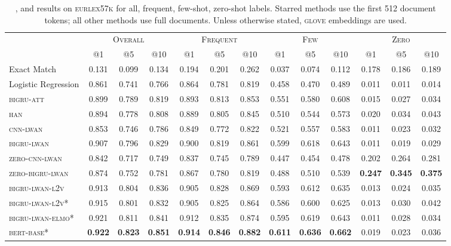 \documentclass[11pt,a4paper]{article}
\newcommand{\bigruatt}{\textsc{bigru-att}\xspace}
\newcommand{\han}{\textsc{han}\xspace}
\newcommand{\lwancnn}{\textsc{cnn-lwan}\xspace}
\newcommand{\zlwancnn}{\textsc{zero-cnn-lwan}\xspace}
\newcommand{\lwangru}{\textsc{bigru-lwan}\xspace}
\newcommand{\lwangrulv}{\textsc{bigru-lwan-l2v}}
\newcommand{\lwangruelmo}{\textsc{bigru-lwan-elmo}}
\newcommand{\zlwangru}{\textsc{zero-bigru-lwan}\xspace}
\newcommand{\glove}{\textsc{glove}\xspace}
\newcommand{\bertbase}{\textsc{bert-base}\xspace}
\newcommand{\newdata}{\textsc{eurlex57k}\xspace}
\begin{document}
\vspace{-2mm}

\begin{table*}[h!]
\centering
{
\footnotesize\addtolength{\tabcolsep}{-2pt}
\begin{tabular}{lcccccccccccc}
  \hline
  & \multicolumn{3}{c}{\textsc{Overall}} & \multicolumn{3}{c}{\textsc{Frequent}} & \multicolumn{3}{c}{\textsc{Few}} & \multicolumn{3}{c}{\textsc{Zero}} \\ 
  & @1 & @5 & @10 & @1 & @5 & @10 & @1 & @5 & @10 & @1 & @5 & @10 \\
  \cline{2-13}
  Exact Match & 0.131 & 0.099 & 0.134 & 0.194 & 0.201 & 0.262 & 0.037 & 0.074 & 0.112 & 0.178 & 0.186 & 0.189 \\
  Logistic Regression & 0.861 & 0.741 & 0.766 & 0.864 & 0.781 & 0.819 & 0.458 & 0.470 & 0.489 & 0.011 & 0.011 & 0.014 \\
  \hline
  \bigruatt & 0.899 & 0.789 & 0.819 & 0.893 & 0.813 & 0.853 & 0.551 & 0.580 & 0.608 & 0.015 & 0.027 & 0.034 \\
  \han & 0.894 & 0.778 & 0.808 & 0.889 & 0.805 & 0.845 & 0.510 & 0.544 & 0.573 & 0.020 & 0.034 & 0.043 \\
  \hline
 \lwancnn & 0.853 & 0.746 & 0.786 & 0.849 & 0.772 & 0.822 & 0.521 & 0.557 & 0.583 & 0.011 & 0.023 & 0.032 \\
  \lwangru & 0.907 & 0.796 & 0.829 & 0.900 & 0.819 & 0.861 & 0.599 & 0.618 & 0.643 & 0.011 & 0.019 & 0.029 \\
   \hline
  \zlwancnn & 0.842 & 0.717 & 0.749 & 0.837 & 0.745 & 0.789 & 0.447 & 0.454 & 0.478 & 0.202 & 0.264 & 0.281 \\
  \zlwangru & 0.874 & 0.752 & 0.781 & 0.867 & 0.780 & 0.819 & 0.488 & 0.510 & 0.539 & \textbf{0.247} & \textbf{0.345} & \textbf{0.375} \\
  \hline\hline
   \lwangrulv & 0.913 & 0.804 & 0.836 & 0.905 & 0.828 & 0.869 & 0.593 & 0.612 & 0.635 & 0.013 & 0.024 & 0.035 \\
\hline
\lwangrulv* & 0.915 & 0.801 & 0.832 & 0.905 & 0.825 & 0.864 & 0.586 & 0.600 & 0.625 & 0.013 & 0.030 & 0.042 \\
\lwangruelmo* & 0.921 & 0.811 & 0.841 & 0.912 & 0.835 & 0.874 & 0.595 & 0.619 & 0.643 & 0.011 & 0.028 & 0.034 \\
  \bertbase* & \textbf{0.922} & \textbf{0.823} & \textbf{0.851} & \textbf{0.914} & \textbf{0.846} & \textbf{0.882} & \textbf{0.611} & \textbf{0.636} & \textbf{0.662} & 0.019 & 0.023 & 0.036 \\
  \hline
\end{tabular}
}
\caption{,  and  results on \newdata for all, frequent, few-shot, zero-shot labels. Starred methods use the first 512 document tokens; all other methods use full documents. Unless otherwise stated, \glove embeddings are used.}
\label{tab:ngcgresults}
\end{table*}
\end{document}
